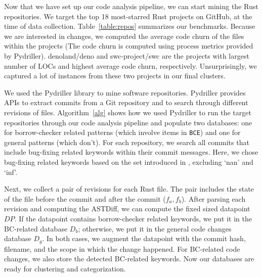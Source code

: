 Now that we have set up our code analysis pipeline, we can start mining the Rust repositories. We target the top 18 most-starred Rust projects on GitHub, at the time of data collection. Table~\ref{table:repos} summarizes our benchmarks. Because we are interested in changes, we computed the average code churn of the files within the projects (The code churn is computed using process metrics provided by Pydriller). denoland/deno and swc-project/swc are the projects with largest number of LOCs and highest average code churn, respectively. Unsurprisingly, we captured a lot of instances from these two projects in our final clusters.

We used the Pydriller library to mine software repositories. Pydriller provides APIs to extract commits from a Git repository and to search through different revisions of files. Algorithm~\ref{alg} shows how we used Pydriller to run the target repositories through our code analysis pipeline and populate two databases: one for borrow-checker related patterns (which involve items in \texttt{BCE}) and one for general patterns (which don't). For each repository, we search all commits that include bug-fixing related keywords within their commit messages. Here, we chose bug-fixing related keywords based on the set introduced in \cite{zhang2018empirical}, excluding `nan' and `inf'. 


Next, we collect a pair of revisions for each Rust file. The pair includes the state of the file before the commit and after the commit ($f_a, f_b$). After parsing each revision and computing the ASTDiff, we can compute the fixed sized datapoint $\mathit{DP}$. If the datapoint contains borrow-checker related keywords, we put it in the BC-related database $D_b$; otherwise, we put it in the general code changes database $D_g$. In both cases, we augment the datapoint with the commit hash, filename, and the scope in which the change happened. For BC-related code changes, we also store the detected BC-related keywords. Now our databases are ready for clustering and categorization.

